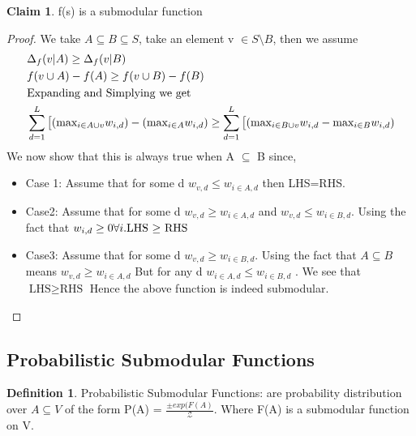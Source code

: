 \documentclass[a4paper,twoside]{iiththesis}
\theoremstyle{definition}
\newtheorem{definition}{Definition}[section]
\theoremstyle{definition}
\newtheorem{claim}{Claim}[section]
\theoremstyle{remark}
\begin{document}
\theoremstyle{claim} 
\begin{claim}
f(s) is a submodular function
\end{claim}
\begin{proof}
We take $A\subseteq B \subseteq S$, take an element v $\in S\setminus B$, then we assume 
\begin{align}
			& \Delta_f(v | A) \geq \Delta_f(v|B) \\
            & f(v \cup A) -f(A) \geq f(v \cup B) - f(B) \\
            & \text{Expanding and Simplying we get} \\
            &  \sum_{d=1}^L \big[(\text{max}_{i \in A \cup v} \space w_{i, d}) - (\text{max}_{i \in A} \space w_{i, d}) \geq  \sum_{d=1}^L \big[(\text{max}_{i \in B \cup v} \space w_{i, d} - \text{max}_{i \in B} \space w_{i, d})
\end{align}
We now show that this is always true when  A $\subseteq$ B since, 
\begin{itemize}
\item  Case 1: Assume that for some d $w_{v, d} \leq w_{i\in A, d}$ then LHS=RHS.
\item Case2: Assume that for some d $w_{v, d} \ge w_{i\in A, d}$ and $w_{v, d} \leq w_{i\in B, d}$. Using the fact that $w_{i, d} \geq 0 \forall{i}.\\ \text{LHS $\geq$ RHS}$
\item Case3:  Assume that for some d $w_{v, d} \geq w_{i\in B, d}$. Using the fact that $A \subseteq B$ means 
$w_{v, d} \geq w_{i\in A, d}$ But for any d $w_{i\in A, d} \leq w_{i \in B, d}$ . We see that $\text{LHS} \geq \text{RHS}$
Hence the above function is indeed submodular.
\end{itemize}
\end{proof}

\subsection{Probabilistic Submodular Functions}
\begin{definition}Probabilistic Submodular Functions: 
are probability distribution over $A \subseteq V$  of the form P(A) = $\frac{\pm exp(F(A)}{\mathcal{Z}}$. Where F(A) is a submodular function on V.
\end{definition}
\end{document}
